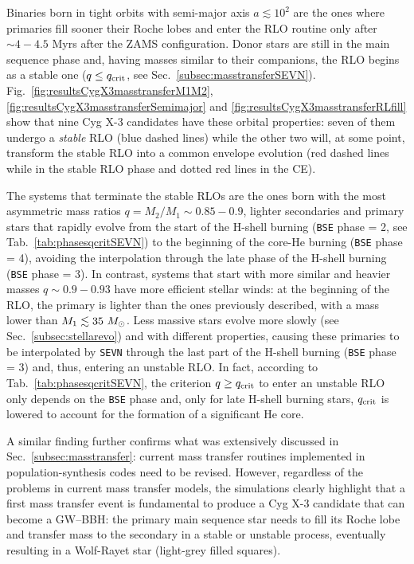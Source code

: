 \documentclass[a4paper,titlepage]{book}     	%
\newcommand{\sun}{\ensuremath{_\odot}}
\newcommand{\msun}{\ensuremath{M\sun}}
\begin{document}
Binaries born in tight orbits with semi-major axis $a \lesssim 10^2$ are the ones where primaries fill sooner their Roche lobes and enter the RLO routine only after $\sim 4 - 4.5$ Myrs after the ZAMS configuration. Donor stars are still in the main sequence phase and, having masses similar to their companions, the RLO begins as a stable one ($q \leq q_{\rm crit}$, see Sec.\ \ref{subsec:masstransferSEVN}). Fig.\ \ref{fig:resultsCygX3masstransferM1M2}, \ref{fig:resultsCygX3masstransferSemimajor} and \ref{fig:resultsCygX3masstransferRLfill} show that nine Cyg X-3 candidates have these orbital properties: seven of them undergo a \emph{stable} RLO (blue dashed lines) while the other two will, at some point, transform the stable RLO into a common envelope evolution (red dashed lines while in the stable RLO phase and dotted red lines in the CE).

The systems that terminate the stable RLOs are the ones born with the most asymmetric mass ratios $q=M_2/M_1 \sim 0.85-0.9$, lighter secondaries and primary stars that rapidly evolve from the start of the H-shell burning (\texttt{BSE} phase = 2, see Tab.\ \ref{tab:phasesqcritSEVN}) to the beginning of the core-He burning (\texttt{BSE} phase = 4), avoiding the interpolation through the late phase of the H-shell burning (\texttt{BSE} phase = 3). In contrast, systems that start with more similar and heavier masses $q \sim 0.9-0.93$ have more efficient stellar winds: at the beginning of the RLO, the primary is lighter than the ones previously described, with a mass lower than $M_{\rm 1} \lesssim 35~\msun$. Less massive stars evolve more slowly (see Sec.\ \ref{subsec:stellarevo}) and with different properties, causing these primaries to be interpolated by \texttt{SEVN} through the last part of the H-shell burning (\texttt{BSE} phase = 3) and, thus, entering an unstable RLO. In fact, according to Tab.\ \ref{tab:phasesqcritSEVN}, the criterion $q \geq q_{\rm crit}$ to enter an unstable RLO only depends on the \texttt{BSE} phase and, only for late H-shell burning stars, $q_{\rm crit}$ is lowered to account for the formation of a significant He core.

A similar finding further confirms what was extensively discussed in Sec.\ \ref{subsec:masstransfer}: current mass transfer routines implemented in population-synthesis codes need to be revised. However, regardless of the problems in current mass transfer models, the simulations clearly highlight that a first mass transfer event is fundamental to produce a Cyg X-3 candidate that can become a GW--BBH: the primary main sequence star needs to fill its Roche lobe and transfer mass to the secondary in a stable or unstable process, eventually resulting in a Wolf-Rayet star (light-grey filled squares).\\
\end{document}
